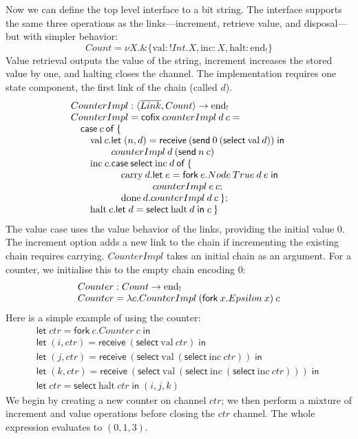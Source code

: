 \documentclass[orivec,envcountsame]{llncs}
\makeatletter
\newcommand{\with}{\mathbin\binampersand}
\newcommand{\gvdual}[1]{\overline{#1}}
\newcommand{\gvout}[2]{{!#1.#2}}
\newcommand{\uto}{\ensuremath{\rightarrow}}
\newcommand{\outterm}{\mathrm{end}_!}
\newcommand{\mkwd}[1]{\mathsf{#1}}
\newcommand{\clabel}[1]{\mathrm{#1}}
\newcommand{\gvsend}[2]{\mkwd{send}\:#1\:#2}
\newcommand{\gvreceive}[1]{\mkwd{receive}\:#1}
\newcommand{\gvlet}[3]{\mkwd{let}\;#1 = #2\;\mkwd{in}\;#3}
\newcommand{\gvselect}[2]{\mkwd{select}\:#1\:#2}
\newcommand{\gvfork}[2]{\mkwd{fork}\:#1.#2}
\newcommand{\lrkwd}{\mkwd{cofix}}
\newcommand{\ba}{\begin{array}}
\newcommand{\ea}{\end{array}}
\newcommand{\bl}{\ba[t]{@{}l@{}}}
\newcommand{\el}{\ea}
\makeatother
\begin{document}
Now we can define the top level interface to a bit string. The interface supports the same three
operations as the links---increment, retrieve value, and disposal---but with simpler behavior:
\[
  Count = \nu X. \with \{ \clabel{val}: \gvout{Int}{X}, \clabel{inc}: X, \clabel{halt}: \outterm \}
\]
Value retrieval outputs the value of the string, increment increases the stored value by one, and
halting closes the channel. The implementation requires one state component, the first link of the
chain (called $d$).
\[
\bl
CounterImpl : \langle \gvdual{Link}, Count \rangle \uto \outterm \\
CounterImpl = \lrkwd\:counterImpl\:d\:c = \\
\quad \mkwd{case}\:c\:\mkwd{of}\:\{ \\
\quad \quad
  \bl
  \clabel{val}\:c.
     \bl
     \gvlet{(n,d)}{\gvreceive{(\gvsend{0}{(\gvselect{\clabel{val}}{d})})}} \\
     counterImpl\:d\:(\gvsend{n}{c}) \\
     \el \\
  \clabel{inc}\:c.
    \bl
    \mkwd{case}\:\gvselect{\clabel{inc}}{d}\:\mkwd{of}\:\{ \\
    \quad
      \bl
      \clabel{carry}\:d.
         \bl
         \gvlet{e}{\gvfork{e}{Node\:True\:d\:e}}{} \\
         counterImpl\:e\:c; \\
         \el \\
      \clabel{done}\:d.counterImpl\:d\:c\:\}; \\
      \el \\
    \el \\
  \clabel{halt}\:c.\gvlet{d}{\gvselect{\clabel{halt}}{d}}{c}\:\}
  \el \\
\el
\]
The value case uses the value behavior of the links, providing the initial value 0.  The increment
option adds a new link to the chain if incrementing the existing chain requires
carrying. $CounterImpl$ takes an initial chain as an argument. For a counter, we initialise this to
the empty chain encoding $0$:
\[\bl
  Counter : Count \uto \outterm \\
  Counter = \lambda c.CounterImpl\:(\gvfork{x}{Epsilon\:x})\:c \\
\el\]
Here is a simple example of using the counter:
\[\begin{array}{l}
\gvlet{ctr}{\gvfork{c}{Counter\:c}}{} \\
\gvlet{(i,ctr)}{\gvreceive{(\gvselect{\clabel{val}}{ctr})}}{} \\
\gvlet{(j,ctr)}{\gvreceive{(\gvselect{\clabel{val}}{(\gvselect{\clabel{inc}}{ctr})})}}{} \\
\gvlet{(k,ctr)}{\gvreceive{(\gvselect{\clabel{val}}{(\gvselect{\clabel{inc}}{(\gvselect{\clabel{inc}}{ctr})})})}}{} \\
\gvlet{ctr}{\gvselect{\clabel{halt}}{ctr}}{(i,j,k)}
\end{array}\]
We begin by creating a new counter on channel $ctr$; we then perform a mixture of increment and
value operations before closing the $ctr$ channel.  The whole expression evaluates to $(0,1,3)$.
\end{document}

